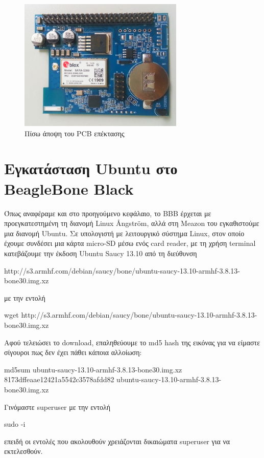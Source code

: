 \documentclass[12pt, a4paper, oneside]{report}
\begin{document}
\begin{figure}[!hb]
\centering
\includegraphics[width=0.7\textwidth]{eikona_25}
\caption{Πίσω άποψη του PCB επέκτασης}\label{eik25}
\end{figure}
\clearpage

\section{Εγκατάσταση Ubuntu στο BeagleBone Black}

Όπως αναφέραμε και στο προηγούμενο κεφάλαιο, το BBB έρχεται με προεγκατεστημένη τη διανομή \textenglish{Linux \AA ngstr\"om}, αλλά στη Meazon του εγκαθιστούμε μια διανομή Ubuntu. Σε υπολογιστή με λειτουργικό σύστημα Linux, στον οποίο έχουμε συνδέσει μια κάρτα micro-SD μέσω ενός card reader, με τη χρήση terminal κατεβάζουμε την έκδοση Ubuntu Saucy 13.10 από τη διεύθυνση 
\begin{code}
http://s3.armhf.com/debian/saucy/bone/ubuntu-saucy-13.10-armhf-3.8.13-bone30.img.xz
\end{code}
με την εντολή
\begin{code}
wget http://s3.armhf.com/debian/saucy/bone/ubuntu-saucy-13.10-armhf-3.8.13-bone30.img.xz
\end{code}
Αφού τελειώσει το download, επαληθεύουμε το md5 hash της εικόνας για να είμαστε σίγουροι πως δεν έχει πάθει κάποια αλλοίωση:
\begin{code}
md5sum ubuntu-saucy-13.10-armhf-3.8.13-bone30.img.xz
8173dffeaae12421a5542c3578afdd82 ubuntu-saucy-13.10-armhf-3.8.13-bone30.img.xz
\end{code}
Γινόμαστε superuser με την εντολή 
\begin{code}
sudo -i
\end{code}
επειδή οι εντολές που ακολουθούν χρειάζονται δικαιώματα superuser για να εκτελεσθούν.
\end{document}
